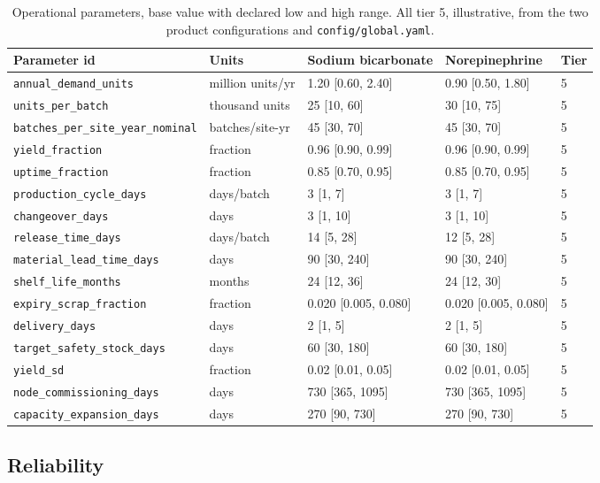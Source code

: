\begin{table}[htbp]
\centering
\caption{Operational parameters, base value with declared low and high range. All tier 5,
illustrative, from the two product configurations and \texttt{config/global.yaml}.}
\label{tab:ops}
\scriptsize
\setlength{\tabcolsep}{4pt}
\begin{tabular}{@{}lllll@{}}
\toprule
Parameter id & Units & Sodium bicarbonate & Norepinephrine & Tier \\
\midrule
\texttt{annual\_demand\_units} & million units/yr & 1.20 [0.60, 2.40] & 0.90 [0.50, 1.80] & 5 \\
\texttt{units\_per\_batch} & thousand units & 25 [10, 60] & 30 [10, 75] & 5 \\
\texttt{batches\_per\_site\_year\_nominal} & batches/site-yr & 45 [30, 70] & 45 [30, 70] & 5 \\
\texttt{yield\_fraction} & fraction & 0.96 [0.90, 0.99] & 0.96 [0.90, 0.99] & 5 \\
\texttt{uptime\_fraction} & fraction & 0.85 [0.70, 0.95] & 0.85 [0.70, 0.95] & 5 \\
\texttt{production\_cycle\_days} & days/batch & 3 [1, 7] & 3 [1, 7] & 5 \\
\texttt{changeover\_days} & days & 3 [1, 10] & 3 [1, 10] & 5 \\
\texttt{release\_time\_days} & days/batch & 14 [5, 28] & 12 [5, 28] & 5 \\
\texttt{material\_lead\_time\_days} & days & 90 [30, 240] & 90 [30, 240] & 5 \\
\texttt{shelf\_life\_months} & months & 24 [12, 36] & 24 [12, 30] & 5 \\
\texttt{expiry\_scrap\_fraction} & fraction & 0.020 [0.005, 0.080] & 0.020 [0.005, 0.080] & 5 \\
\texttt{delivery\_days} & days & 2 [1, 5] & 2 [1, 5] & 5 \\
\texttt{target\_safety\_stock\_days} & days & 60 [30, 180] & 60 [30, 180] & 5 \\
\texttt{yield\_sd} & fraction & 0.02 [0.01, 0.05] & 0.02 [0.01, 0.05] & 5 \\
\texttt{node\_commissioning\_days} & days & 730 [365, 1095] & 730 [365, 1095] & 5 \\
\texttt{capacity\_expansion\_days} & days & 270 [90, 730] & 270 [90, 730] & 5 \\
\bottomrule
\end{tabular}
\end{table}

\subsection{Reliability}
\label{sec:reliability}

